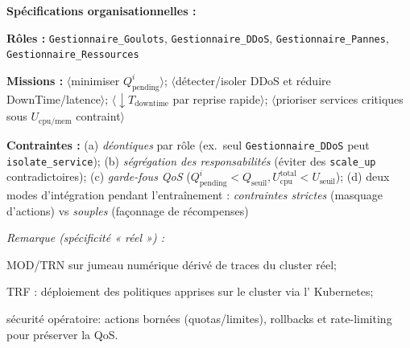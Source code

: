 \noindent\textbf{Spécifications organisationnelles :}
\begin{enumerate*}[label={\roman*)}, itemjoin={;\quad}]
  \item \textbf{Rôles :} \texttt{Gestionnaire\_Goulots}, \texttt{Gestionnaire\_DDoS}, \texttt{Gestionnaire\_Pannes}, \texttt{Gestionnaire\_Ressources}
  \item \textbf{Missions :}
  \(\langle\)minimiser \(Q_{\text{pending}}^i\)\(\rangle\);
  \(\langle\)détecter/isoler DDoS et réduire DownTime/latence\(\rangle\);
  \(\langle\)\(\downarrow T_{\text{downtime}}\) par reprise rapide\(\rangle\);
  \(\langle\)prioriser services critiques sous \(U_{\text{cpu/mem}}\) contraint\(\rangle\)
  \item \textbf{Contraintes :}
  (a) \emph{déontiques} par rôle (ex.~seul \texttt{Gestionnaire\_DDoS} peut \texttt{isolate\_service});
  (b) \emph{ségrégation des responsabilités} (éviter des \texttt{scale\_up} contradictoires);
  (c) \emph{garde-fous QoS} (\(Q_{\text{pending}}^i<Q_{\text{seuil}}, U_{\text{cpu}}^{\text{total}}<U_{\text{seuil}}\));
  (d) deux modes d’intégration pendant l’entraînement : \textit{contraintes strictes} (masquage d’actions) vs \textit{souples} (façonnage de récompenses)
\end{enumerate*}

\medskip
\noindent\textit{Remarque (spécificité « réel ») :}
\begin{enumerate*}[label={--}, itemjoin={\quad}]
  \item \textsc{MOD/TRN} sur jumeau numérique dérivé de traces du cluster réel;
  \item \textsc{TRF} : déploiement des politiques apprises sur le cluster via l’ Kubernetes;
  \item sécurité opératoire: actions bornées (quotas/limites), rollbacks et rate-limiting pour préserver la QoS.
\end{enumerate*}

